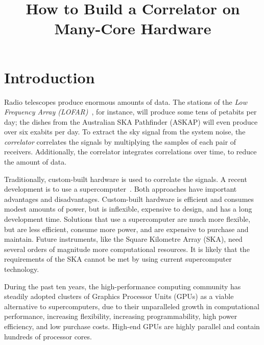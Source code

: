 \documentclass{article}
\title{How to Build a Correlator on Many-Core Hardware}
\begin{document}
\maketitle

\begin{abstract}
\end{abstract}

\section{Introduction}


Radio telescopes produce enormous amounts of data.
The stations of the \emph{Low Frequency Array
(LOFAR)\/}~\cite{Butcher:04,deVos:09}, for instance, will produce some tens of
petabits per day; the dishes from the Australian SKA Pathfinder (ASKAP) will
even produce over six exabits per day.
To extract the sky signal from the system noise, the \emph{correlator\/}
correlates the signals by multiplying the samples of each pair of receivers.
Additionally, the correlator integrates correlations over time, to reduce
the amount of data.

Traditionally, custom-built hardware is used to correlate the signals.
A recent development is to use a supercomputer~\cite{Romein:06,Romein:09b}.
Both approaches have important advantages and disadvantages.
Custom-built hardware is efficient and consumes modest amounts of power, but is
inflexible, expensive to design, and has a long development time.
Solutions that use a supercomputer are much more flexible, but are less
efficient, consume more power, and are expensive to purchase and maintain.
Future instruments, like the Square Kilometre Array (SKA), need several orders
of magnitude more computational resources.
It is likely that the requirements of the SKA cannot be met by using
current supercomputer technology.

During the past ten years, the high-performance computing community has
steadily adopted clusters of Graphics Processor Units (GPUs) as a viable
alternative to supercomputers, due to their unparalleled growth in
computational performance, increasing flexibility, increasing programmability,
high power efficiency, and low purchase costs.
High-end GPUs are highly parallel and contain hundreds of processor cores.
\end{document}
